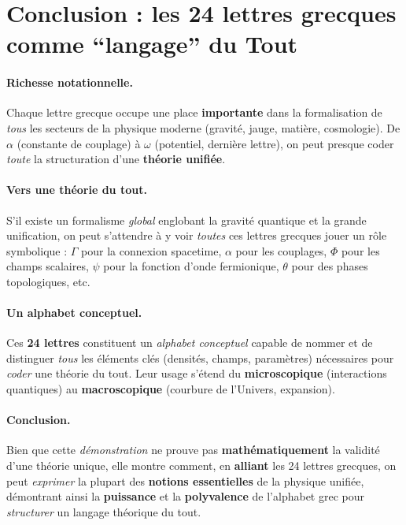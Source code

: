 \documentclass[12pt]{article}
\begin{document}
\section{Conclusion : les 24 lettres grecques comme “langage” du Tout}

\paragraph{Richesse notationnelle.} 
Chaque lettre grecque occupe une place \textbf{importante} dans la formalisation de 
\emph{tous} les secteurs de la physique moderne (gravité, jauge, matière, cosmologie). 
De \(\alpha\) (constante de couplage) à \(\omega\) (potentiel, dernière lettre), 
on peut presque coder \emph{toute} la structuration d'une \textbf{théorie unifiée}.

\paragraph{Vers une théorie du tout.} 
S'il existe un formalisme \emph{global} englobant la gravité quantique et la grande unification, 
on peut s'attendre à y voir \emph{toutes} ces lettres grecques jouer un rôle symbolique : 
\(\Gamma\) pour la connexion spacetime, \(\alpha\) pour les couplages, \(\Phi\) pour 
les champs scalaires, \(\psi\) pour la fonction d'onde fermionique, \(\theta\) pour 
des phases topologiques, etc.

\paragraph{Un alphabet conceptuel.} 
Ces \textbf{24 lettres} constituent un \emph{alphabet conceptuel} 
capable de nommer et de distinguer \emph{tous} les éléments clés 
(densités, champs, paramètres) nécessaires pour \emph{coder} 
une \og théorie du tout\fg. Leur usage s'étend du \textbf{microscopique} 
(interactions quantiques) au \textbf{macroscopique} (courbure de l'Univers, expansion).

\paragraph{Conclusion.}
Bien que cette \emph{démonstration} ne prouve pas \textbf{mathématiquement} 
la validité d'une théorie unique, elle montre comment, en \textbf{alliant} 
les 24 lettres grecques, on peut \emph{exprimer} la plupart des \textbf{notions essentielles} 
de la physique unifiée, démontrant ainsi la \textbf{puissance} et la \textbf{polyvalence} 
de l'alphabet grec pour \emph{structurer} un langage théorique \og du tout\fg.
\end{document}
